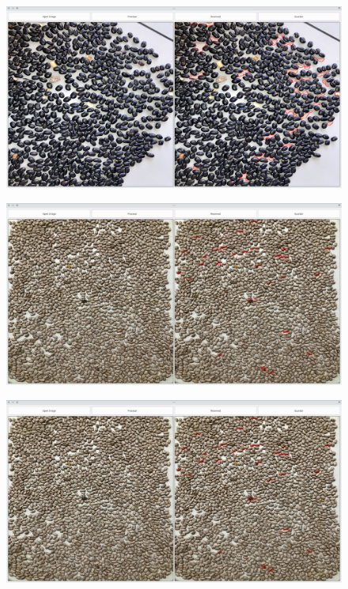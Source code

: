 \documentclass[conference]{IEEEtran}
\begin{document}
    \begin{figure}[H]
        \centering
        \includegraphics[width=\breite\linewidth]{images/test5.png}
        \caption{}
        \label{fig:test5}
    \end{figure}

    \begin{figure}[H]
        \centering
        \includegraphics[width=\breite\linewidth]{images/test6.png}
        \caption{}
        \label{fig:test6}
    \end{figure}

    \begin{figure}[H]
        \centering
        \includegraphics[width=\breite\linewidth]{images/test7.png}
        \caption{}
        \label{fig:test7}
    \end{figure}
\end{document}
